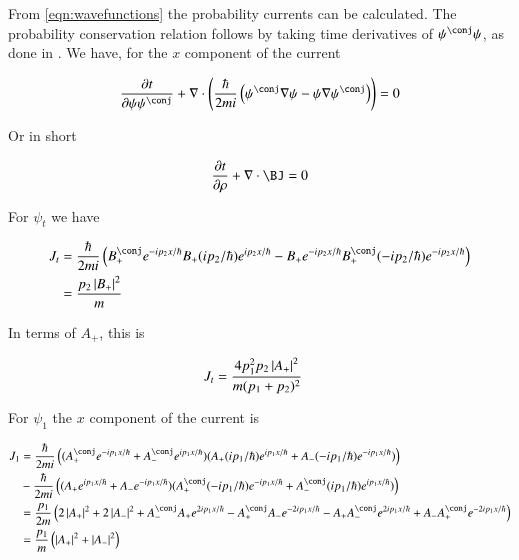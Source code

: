 \documentclass{article}
\begin{document}
From \ref{eqn:wavefunctions}
the probability currents can be calculated.  The probability 
conservation relation follows by taking time derivatives of $\psi^\conj\psi$, as done in \cite{PJprobCurrent}.  We have, for the $x$ component of the current

\begin{align*}
\PD{t}{\psi\psi^\conj} + \grad \cdot \left(
\frac{\hbar}{2 m i} 
\left( 
\psi^\conj \grad \psi
-\psi \grad \psi^\conj
\right)
\right) = 0
\end{align*}

Or in short

\begin{align*}
\PD{t}{\rho} + \grad \cdot \BJ = 0
\end{align*}

For $\psi_t$ we have

\begin{align*}
J_t 
&= 
\frac{\hbar}{2 m i} 
\left( 
B_{+}^\conj e^{ -i p_2 x/\hbar }
B_{+} (i p_2 /\hbar)e^{ i p_2 x/\hbar }
-B_{+} e^{ -i p_2 x/\hbar }
B_{+}^\conj (-i p_2 /\hbar)e^{ -i p_2 x/\hbar }
\right) \\
&= \frac{ p_2 \Abs{ B_{+} }^2}{m } \\
\end{align*}

In terms of $A_{+}$, this is

\begin{align}\label{eqn:currentTransmitted}
J_t &= \frac{ 4 p_1^2 p_2 \left\lvert{ A_{+} }\right\rvert^2}{m (p_1 + p_2)^2}
\end{align}

For $\psi_1$ the $x$ component of the current is

\begin{align*}
J_1 
&= 
\frac{\hbar}{2 m i} 
\left( 
(A_{+}^\conj e^{ -i p_1 x/\hbar }
+A_{-}^\conj e^{ i p_1 x/\hbar })
(A_{+} (i p_1 /\hbar)e^{ i p_1 x/\hbar }
+A_{-} (-i p_1 /\hbar)e^{ -i p_1 x/\hbar }) 
\right)
\\
&
-
\frac{\hbar}{2 m i} \left(
(
A_{+} e^{ i p_1 x/\hbar } +A_{-} e^{ -i p_1 x/\hbar })
(A_{+}^\conj (-i p_1 /\hbar)e^{ -i p_1 x/\hbar }
+A_{-}^\conj (i p_1 /\hbar)e^{ i p_1 x/\hbar })
\right) \\
&=
\frac{p_1}{2m} 
\left(
2\Abs{A_{+} }^2
+2\Abs{A_{-} }^2
+
A_{-}^\conj A_{+} e^{ 2 i p_1 x/\hbar }
-A_{+}^\conj A_{-} e^{ -2 i p_1 x/\hbar }
-A_{+} A_{-}^\conj e^{ 2 i p_1 x/\hbar }
+A_{-} A_{+}^\conj e^{ -2 i p_1 x/\hbar }
\right) \\
&=
\frac{p_1}{m} 
\left(
\Abs{A_{+} }^2
+\Abs{A_{-} }^2
\right) \\
\end{align*}
\end{document}
